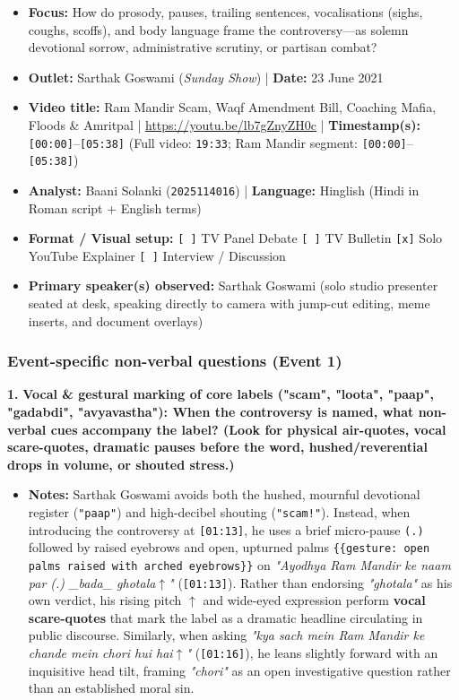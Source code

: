 \documentclass[10pt,a4paper]{article}
\begin{document}
\begin{itemize}
  \item \textbf{Focus:} How do prosody, pauses, trailing sentences, vocalisations (sighs, coughs, scoffs), and body language frame the controversy---as solemn devotional sorrow, administrative scrutiny, or partisan combat?
  \item \textbf{Outlet:} Sarthak Goswami (\textit{Sunday Show}) | \textbf{Date:} 23 June 2021
  \item \textbf{Video title:} Ram Mandir Scam, Waqf Amendment Bill, Coaching Mafia, Floods \& Amritpal | \href{https://youtu.be/lb7gZnyZH0c}{https://youtu.be/lb7gZnyZH0c} | \textbf{Timestamp(s):} \texttt{[00:00]}--\texttt{[05:38]} (Full video: \texttt{19:33}; Ram Mandir segment: \texttt{[00:00]}--\texttt{[05:38]})
  \item \textbf{Analyst:} Baani Solanki (\texttt{2025114016}) | \textbf{Language:} Hinglish (Hindi in Roman script + English terms)
  \item \textbf{Format / Visual setup:} \texttt{[ ]} TV Panel Debate \texttt{[ ]} TV Bulletin \texttt{[x]} Solo YouTube Explainer \texttt{[ ]} Interview / Discussion
  \item \textbf{Primary speaker(s) observed:} Sarthak Goswami (solo studio presenter seated at desk, speaking directly to camera with jump-cut editing, meme inserts, and document overlays)
\end{itemize}

\subsubsection*{Event-specific non-verbal questions (Event 1)}

\noindent\textbf{1.} \textbf{Vocal \& gestural marking of core labels ("scam", "loota", "paap", "gadabdi", "avyavastha"): When the controversy is named, what non-verbal cues accompany the label? (Look for physical air-quotes, vocal scare-quotes, dramatic pauses before the word, hushed/reverential drops in volume, or shouted stress.)}\par\smallskip
\begin{itemize}
  \item \textbf{Notes:}
Sarthak Goswami avoids both the hushed, mournful devotional register (\texttt{"paap"}) and high-decibel shouting (\texttt{"scam!"}). Instead, when introducing the controversy at \texttt{[01:13]}, he uses a brief micro-pause \texttt{(.)} followed by raised eyebrows and open, upturned palms \texttt{\{\{gesture: open palms raised with arched eyebrows\}\}} on \textit{"Ayodhya Ram Mandir ke naam par (.) \_bada\_ ghotala$\uparrow$"} (\texttt{[01:13]}). Rather than endorsing \textit{"ghotala"} as his own verdict, his rising pitch \texttt{$\uparrow$} and wide-eyed expression perform \textbf{vocal scare-quotes} that mark the label as a dramatic headline circulating in public discourse. Similarly, when asking \textit{"kya sach mein Ram Mandir ke chande mein chori hui hai$\uparrow$"} (\texttt{[01:16]}), he leans slightly forward with an inquisitive head tilt, framing \textit{"chori"} as an open investigative question rather than an established moral sin.\par\smallskip
\end{itemize}
\end{document}
